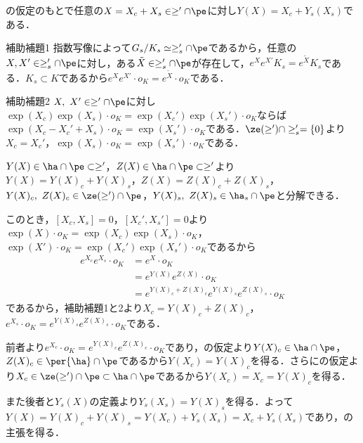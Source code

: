\begin{lem}\label{lem:0117-decomp}
  の仮定のもとで任意の$X = X_c + X_s \in \ge'\cap\pe $に対し$Y(X) = X_c + Y_s(X_s) $である．
\end{lem}
\begin{npfwn}

  \leavevmode
  \begin{itembox}[l]{補助補題1}
    指数写像によって$G_s/K_s \simeq \ge_s'\cap \pe $であるから，任意の$X, X'\in \ge_{s}'\cap \pe $に対し，ある$\tilde{X}\in \ge_s'\cap \pe$が存在して，$e^{X}e^{X'}K_s = e^{\tilde{X}}K_s  $である．$K_s\subset K $であるから$e^{X}e^{X'}\cdot o_K = e^{\tilde{X}}\cdot o_K $である．
  \end{itembox}
  
  
  \begin{itembox}[l]{補助補題2}
    $X,\ X'\in \ge'\cap\pe $に対し$\exp(X_c)\exp(X_s)\cdot o_K = \exp(X_c')\exp(X_s')\cdot o_K $ならば$\exp(X_c-X_c'+X_s)\cdot o_K = \exp(X_s')\cdot o_K $である．$\ze(\ge')\cap \ge_s' = \{0\} $より$X_c = X_c' $，$\exp(X_s)\cdot o_K = \exp(X_s')\cdot o_K$である．
  \end{itembox}
  
  $Y(X)\in \ha\cap\pe\subset \ge' $，$Z(X)\in \ha\cap\pe\subset \ge' $より$Y(X) = Y(X)_c + Y(X)_s $，$Z(X) = Z(X)_c + Z(X)_s $，$Y(X)_c,\ Z(X)_c \in \ze(\ge')\cap\pe  $，$Y(X)_s,\ Z(X)_s\in \ha_s\cap\pe $と分解できる．

  このとき，$[X_c, X_s] = 0 $，$[X_c', X_s'] = 0$より$\exp(X)\cdot o_K = \exp(X_c)\exp(X_s)\cdot o_K $，$\exp(X')\cdot o_K = \exp(X_c')\exp(X_s')\cdot o_K $であるから
  \begin{align*}
    e^{X_c}e^{X_s}\cdot o_K &= e^{X}\cdot o_K \\
                            &= e^{Y(X)}e^{Z(X)}\cdot o_K\\
                            &= e^{Y(X)_c + Z(X)_c}e^{Y(X)_s}e^{Z(X)_s}\cdot o_K
  \end{align*}
  であるから，補助補題1と2より$X_c = Y(X)_c + Z(X)_c $，$e^{X_s}\cdot o_K = e^{Y(X)_s}e^{Z(X)_s}\cdot o_K $である．

  前者より$e^{X_c} \cdot o_K = e^{Y(X)_c}e^{Z(X)_c}\cdot o_K $であり，の仮定より$Y(X)_c \in \ha\cap \pe$，$  Z(X)_c \in \per{\ha}\cap \pe$であるから$Y(X_c) = Y(X)_c $を得る．さらにの仮定より$X_c\in \ze(\ge')\cap \pe\subset \ha \cap \pe $であるから$Y(X_c) = X_c = Y(X)_c $を得る．

  また後者と$Y_s(X) $の定義より$Y_s(X_s) = Y(X)_s $を得る．よって$Y(X) = Y(X)_c + Y(X)_s = Y(X_c) + Y_s(X_s) = X_c + Y_s(X_s) $であり，の主張を得る．  
\end{npfwn}


